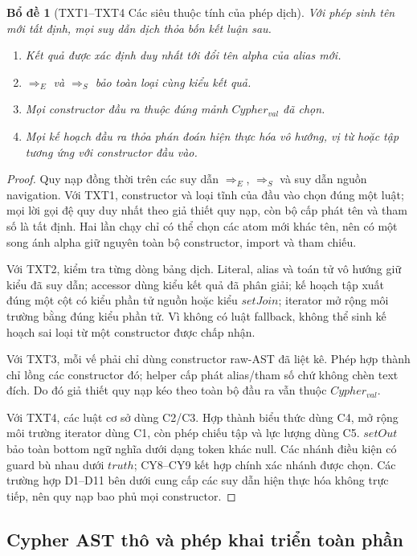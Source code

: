 \documentclass[11pt,a4paper]{article}
\newtheorem{lemma}{Bổ đề}
\theoremstyle{definition}
\begin{document}
\begin{lemma}[TXT1--TXT4 Các siêu thuộc tính của phép dịch]
Với phép sinh tên mới tất định, mọi suy dẫn dịch thỏa bốn kết luận sau.
\begin{enumerate}[label=(TXT\arabic*)]
  \item Kết quả được xác định duy nhất tới đổi tên alpha của alias mới.
  \item $\Rightarrow_E$ và $\Rightarrow_S$ bảo toàn loại cùng kiểu kết quả.
  \item Mọi constructor đầu ra thuộc đúng mảnh $Cypher_{val}$ đã chọn.
  \item Mọi kế hoạch đầu ra thỏa phán đoán hiện thực hóa vô hướng, vị từ hoặc
  tập tương ứng với constructor đầu vào.
\end{enumerate}
\end{lemma}
\begin{proof}
Quy nạp đồng thời trên các suy dẫn $\Rightarrow_E$, $\Rightarrow_S$ và suy dẫn
nguồn navigation. Với TXT1, constructor và loại tĩnh của đầu vào chọn đúng một
luật; mọi lời gọi đệ quy duy nhất theo giả thiết quy nạp, còn bộ cấp phát tên và
tham số là tất định. Hai lần chạy chỉ có thể chọn các atom mới khác tên, nên có
một song ánh alpha giữ nguyên toàn bộ constructor, import và tham chiếu.

Với TXT2, kiểm tra từng dòng bảng dịch. Literal, alias và toán tử vô hướng giữ
kiểu đã suy dẫn; accessor dùng kiểu kết quả đã phân giải; kế hoạch tập xuất đúng
một cột có kiểu phần tử nguồn hoặc kiểu $setJoin$; iterator mở rộng môi trường
bằng đúng kiểu phần tử. Vì không có luật fallback, không thể sinh kế hoạch sai
loại từ một constructor được chấp nhận.

Với TXT3, mỗi vế phải chỉ dùng constructor raw-AST đã liệt kê. Phép hợp thành
chỉ lồng các constructor đó; helper cấp phát alias/tham số chứ không chèn text
đích. Do đó giả thiết quy nạp kéo theo toàn bộ đầu ra vẫn thuộc
$Cypher_{val}$.

Với TXT4, các luật cơ sở dùng C2/C3. Hợp thành biểu thức dùng C4, mở rộng môi
trường iterator dùng C1, còn phép chiếu tập và lực lượng dùng C5. $setOut$ bảo
toàn bottom ngữ nghĩa dưới dạng token khác null. Các nhánh điều kiện có guard
bù nhau dưới $truth$; CY8--CY9 kết hợp chính xác nhánh được chọn. Các trường hợp
D1--D11 bên dưới cung cấp các suy dẫn hiện thực hóa không trực tiếp, nên quy nạp
bao phủ mọi constructor.
\end{proof}

\subsection{Cypher AST thô và phép khai triển toàn phần}
\end{document}
